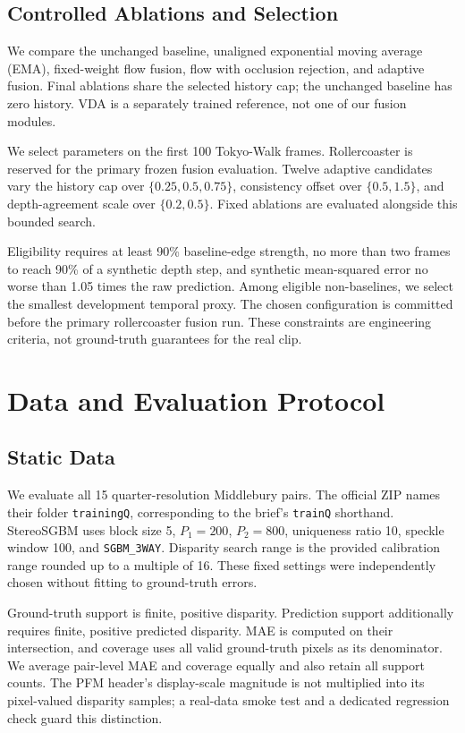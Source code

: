 \documentclass[10pt,twocolumn,letterpaper]{article}
\begin{document}
\subsection{Controlled Ablations and Selection}
We compare the unchanged baseline, unaligned exponential moving average (EMA), fixed-weight flow fusion, flow with occlusion rejection, and adaptive fusion. Final ablations share the selected history cap; the unchanged baseline has zero history. VDA is a separately trained reference, not one of our fusion modules.

We select parameters on the first 100 Tokyo-Walk frames. Rollercoaster is reserved for the primary frozen fusion evaluation. Twelve adaptive candidates vary the history cap over $\{0.25,0.5,0.75\}$, consistency offset over $\{0.5,1.5\}$, and depth-agreement scale over $\{0.2,0.5\}$. Fixed ablations are evaluated alongside this bounded search.

Eligibility requires at least 90\% baseline-edge strength, no more than two frames to reach 90\% of a synthetic depth step, and synthetic mean-squared error no worse than 1.05 times the raw prediction. Among eligible non-baselines, we select the smallest development temporal proxy. The chosen configuration is committed before the primary rollercoaster fusion run. These constraints are engineering criteria, not ground-truth guarantees for the real clip.

\section{Data and Evaluation Protocol}
\subsection{Static Data}
We evaluate all 15 quarter-resolution Middlebury pairs. The official ZIP names their folder \texttt{trainingQ}, corresponding to the brief's \texttt{trainQ} shorthand. StereoSGBM uses block size 5, $P_1=200$, $P_2=800$, uniqueness ratio 10, speckle window 100, and \texttt{SGBM\_3WAY}. Disparity search range is the provided calibration range rounded up to a multiple of 16. These fixed settings were independently chosen without fitting to ground-truth errors.

Ground-truth support is finite, positive disparity. Prediction support additionally requires finite, positive predicted disparity. MAE is computed on their intersection, and coverage uses all valid ground-truth pixels as its denominator. We average pair-level MAE and coverage equally and also retain all support counts. The PFM header's display-scale magnitude is not multiplied into its pixel-valued disparity samples; a real-data smoke test and a dedicated regression check guard this distinction.
\end{document}
